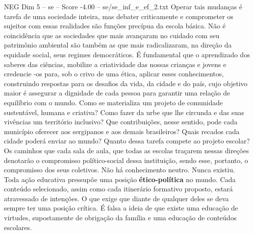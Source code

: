 \begin{textsample}{NEG Dim 5 – se – Score -4.00 – se/se\_inf\_e\_ef\_2.txt}
Operar tais mudanças é tarefa de uma sociedade inteira, mas debater criticamente e comprometer os sujeitos com essas realidades são funções precípua da escola básica.
Não é coincidência que as sociedades que mais avançaram no cuidado com seu patrimônio ambiental são também as que mais radicalizaram, na direção da equidade social, seus regimes democráticos.
É fundamental que o aprendizado dos saberes das ciências, mobilize a criatividade das nossas crianças e jovens e credencie -os para, sob o crivo de uma ética, aplicar esses conhecimentos, construindo respostas para os desafios da vida, da cidade e do país, cujo objetivo maior é assegurar a dignidade de cada pessoa para garantir uma relação de equilíbrio com o mundo.
Como se materializa um projeto de comunidade sustentável, humana e criativa?
Como fazer da urbe que lhe circunda e das suas vivências um território inclusivo?
Que contribuições, nesse sentido, pode cada município oferecer aos sergipanos e aos demais brasileiros?
Quais recados cada cidade poderá enviar ao mundo?
Quanto dessa tarefa compete ao projeto escolar?
Os caminhos que cada sala de aula, que todas as escolas traçarem nessas direções denotarão o compromisso político-social dessa instituição, sendo esse, portanto, o compromisso dos seus coletivos.
Não há conhecimento neutro.
Nunca existiu.
Toda ação educativa pressupõe uma posição \textbf{ético-política} no mundo.
Cada conteúdo selecionado, assim como cada itinerário formativo proposto, estará atravessado de intenções.
O que exige que diante de qualquer deles se deva sempre ter uma posição crítica.
É falsa a ideia de que existe uma educação de virtudes, supostamente de obrigação da família e uma educação de conteúdos escolares.

\end{textsample}
